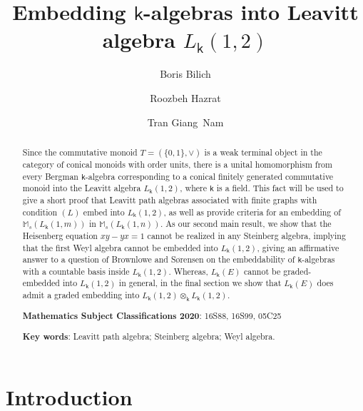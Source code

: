 \documentclass[a4paper, 11pt, reqno]{amsart}
\theoremstyle{definition}
\def\M{\mathbb{M}}
\newcommand{\K}{\mathsf{k}}
\begin{document}
	
\title{Embedding $\K$-algebras into Leavitt algebra $L_\K(1, 2)$}

\author{Boris Bilich}
\address{(Boris Bilich): Department of Mathematics, University of Haifa, Haifa, Israel.
}
\address{Mathematisches Institut, Universit\"at G\"ottingen, G\"ottingen,
Germany
}

\author{Roozbeh Hazrat}
\address{(Roozbeh Hazrat): Centre for Research in Mathematics and Data Science, Western Sydney University, 
			Australia.
}
	
\author{Tran Giang~Nam}
\address{(Tran Giang Nam): Institute of Mathematics, VAST, 18 Hoang Quoc Viet, Nghia Do, Hanoi, Vietnam.}
		

\begin{abstract} Since the commutative monoid $T = (\{0, 1\}, \vee)$ is a weak terminal object in the category of  conical monoids with order units, there is a unital homomorphism from  every Bergman $\K$-algebra corresponding to a conical finitely generated commutative monoid   into the Leavitt algebra $L_\K(1,2)$, where $\K$ is a field. This fact will be used to give a short proof that Leavitt path algebras associated with finite graphs with condition $(L)$  embed into $L_\K(1,2)$, as well as provide criteria for an embedding of $\M_s(L_{\K}(1, m))$ in $\M_s(L_{\K}(1, n))$. As our second main result, we show that the Heisenberg equation $xy-yx=1$ cannot be realized in any Steinberg algebra, implying that the first Weyl algebra cannot be embedded into $L_\K(1,2)$, giving an affirmative answer to a question of  Brownlowe and S\o rensen on the embeddability of $\K$-algebras  with a countable basis inside $L_\K(1,2)$.  Whereas, $L_\K(E)$ cannot be graded-embedded into $L_\K(1,2)$ in general, in the final section we show that $L_\K(E)$ does admit a graded embedding into $L_\K(1,2)\otimes_\K L_\K(1,2)$.

	
\bigskip	
\textbf{Mathematics Subject Classifications 2020}: 16S88, 16S99,  05C25\medskip

\textbf{Key words}: Leavitt path algebra; Steinberg algebra; Weyl algebra.
\end{abstract}	
	
	
\maketitle

\section{Introduction}
\end{document}
